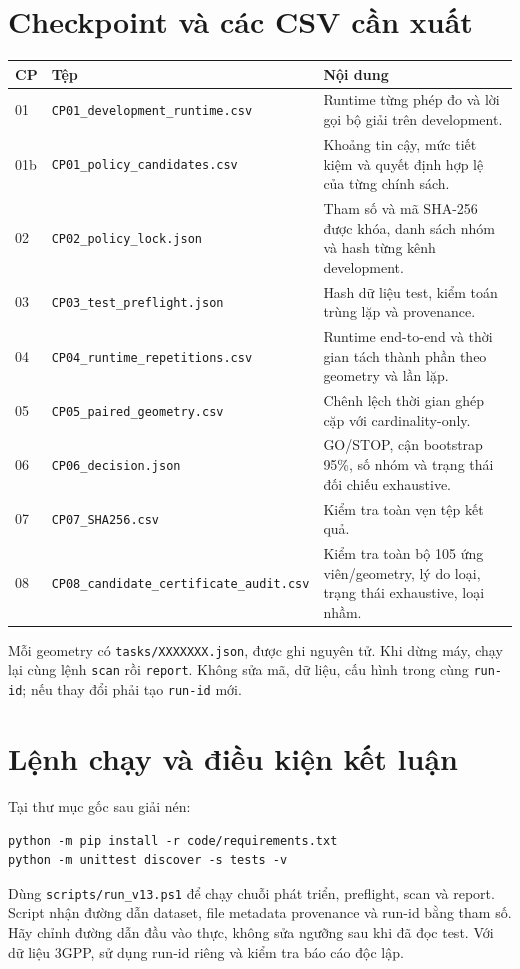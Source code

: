 \documentclass[11pt,onecolumn]{IEEEtran}
\begin{document}
\section{Checkpoint và các CSV cần xuất}
\begin{center}\small
\begin{tabular}{p{15mm}p{54mm}p{95mm}}
\toprule
\textbf{CP} & \textbf{Tệp} & \textbf{Nội dung}\\
\midrule
01 & \texttt{CP01\_development\_runtime.csv} & Runtime từng phép đo và lời gọi bộ giải trên development.\\
01b & \texttt{CP01\_policy\_candidates.csv} & Khoảng tin cậy, mức tiết kiệm và quyết định hợp lệ của từng chính sách.\\
02 & \texttt{CP02\_policy\_lock.json} & Tham số và mã SHA-256 được khóa, danh sách nhóm và hash từng kênh development.\\
03 & \texttt{CP03\_test\_preflight.json} & Hash dữ liệu test, kiểm toán trùng lặp và provenance.\\
04 & \texttt{CP04\_runtime\_repetitions.csv} & Runtime end-to-end và thời gian tách thành phần theo geometry và lần lặp.\\
05 & \texttt{CP05\_paired\_geometry.csv} & Chênh lệch thời gian ghép cặp với cardinality-only.\\
06 & \texttt{CP06\_decision.json} & GO/STOP, cận bootstrap 95\%, số nhóm và trạng thái đối chiếu exhaustive.\\
07 & \texttt{CP07\_SHA256.csv} & Kiểm tra toàn vẹn tệp kết quả.\\
08 & \texttt{CP08\_candidate\_}\newline\texttt{certificate\_audit.csv} & Kiểm tra toàn bộ 105 ứng viên/geometry, lý do loại, trạng thái exhaustive, loại nhầm.\\
\bottomrule
\end{tabular}
\end{center}
Mỗi geometry có \texttt{tasks/XXXXXXX.json}, được ghi nguyên tử. Khi dừng máy, chạy lại cùng lệnh \texttt{scan} rồi \texttt{report}. Không sửa mã, dữ liệu, cấu hình trong cùng \texttt{run-id}; nếu thay đổi phải tạo \texttt{run-id} mới.

\section{Lệnh chạy và điều kiện kết luận}
Tại thư mục gốc sau giải nén:
\begin{verbatim}
python -m pip install -r code/requirements.txt
python -m unittest discover -s tests -v
\end{verbatim}
Dùng \texttt{scripts/run\_v13.ps1} để chạy chuỗi phát triển, preflight, scan và report. Script nhận đường dẫn dataset, file metadata provenance và run-id bằng tham số. Hãy chỉnh đường dẫn đầu vào thực, không sửa ngưỡng sau khi đã đọc test. Với dữ liệu 3GPP, sử dụng run-id riêng và kiểm tra báo cáo độc lập.
\end{document}
